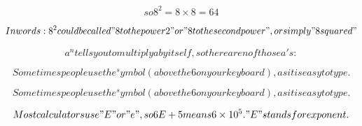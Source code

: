 \[so 8^{2} = 8 \times 8 = 64\]

\[In words: 8^{2} could be called "8 to the power 2" or "8 to the second power", or simply "8 squared"\]

\[a^{n} tells you to multiply a by itself,so there are n of those a's:\]

\[Sometimes people use the ^ symbol (above the 6 on your keyboard), as it is easy to type.\]

\[Sometimes people use the ^ symbol (above the 6 on your keyboard), as it is easy to type.\]

\[Most calculators use "E" or "e", so 6E+5 means 6 \times 10^{5}. "E" stands for exponent.\]

